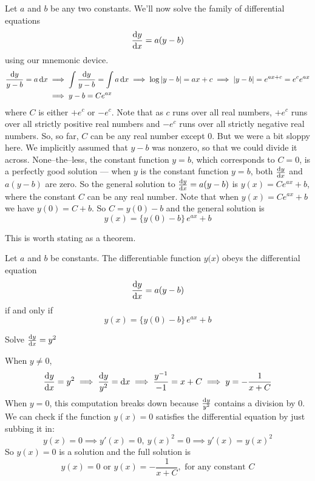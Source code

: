 \begin{eg}\label{eg:SDEsdeFrist}
Let $a$ and $b$ be any two constants. We'll now solve the family of differential
equations
\begin{equation*}
\diff{y}{x} =a(y-b)
\end{equation*}
using our mnemonic device.
\begin{align*}
\frac{\mathrm{d}y}{y-b} =a\,\mathrm{d}x
&\implies
\int \frac{\mathrm{d}y}{y-b}= \int a\,\mathrm{d}x
\implies
\log|y-b|= ax+c
\implies
|y-b|= e^{ax+c} =e^c e^{ax} \\
&\implies y-b = C e^{ax}
\end{align*}
where $C$ is either $+e^c$ or $-e^c$. Note that as $c$ runs over
all real numbers, $+e^c$ runs over all strictly positive real
numbers and $-e^c$ runs over all strictly negative real numbers.
So, so far, $C$ can be any real number except $0$.
But we were a bit sloppy here. We implicitly
assumed that $y-b$ was nonzero, so that we could divide it across.
None--the--less, the constant function $y=b$, which corresponds
to $C=0$, is a perfectly good solution --- when $y$
is the constant function $y=b$, both $\diff{y}{x}$ and $a(y-b)$ are zero.
So the general solution to $\diff{y}{x} =a(y-b)$ is $y(x)=C e^{ax}+b$, where
the constant $C$ can be any real number. Note that when $y(x)=C e^{ax}+b$
we have $y(0)=C+b$. So $C=y(0)-b$ and the general solution is
\begin{equation*}
y(x) = \{y(0)-b\}\,e^{ax} + b
\end{equation*}

\end{eg}

This is worth stating as a theorem.
\begin{theorem}\label{thm:linearODE}
Let $a$ and $b$ be constants.
The differentiable function $y(x$) obeys the differential equation
\begin{equation*}
\diff{y}{x} =a(y-b)
\end{equation*}
if and only if
\begin{equation*}
y(x) = \{y(0)-b\}\,e^{ax} + b
\end{equation*}
\end{theorem}

\begin{eg}\label{eg:SDEsdeA}
 Solve $\diff{y}{x}=y^2$

\soln When $y\ne 0$,
\begin{equation*}
\diff{y}{x}=y^2
\implies \frac{\dee{y}}{y^2}=\dee{x}
\implies \frac{y^{-1}}{-1}=x+C
\implies y=-\frac{1}{x+C}
\end{equation*}
When $y=0$, this computation breaks down because  $ \frac{\mathrm{d}y}{y^2}$
contains a division by 0. We can check if the function $y(x)=0$
satisfies the differential equation by just subbing it in:
\begin{equation*}
y(x)=0\implies y'(x)=0,\ y(x)^2=0\implies y'(x)=y(x)^2
\end{equation*}
So $y(x)=0$ is a solution and the full solution is
\begin{equation*}
y(x)=0 \text{ or } y(x)=-\frac{1}{x+C}, \text{ for any constant $C$}
\end{equation*}
\end{eg}

